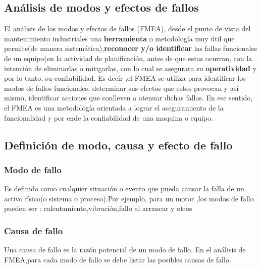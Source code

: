 \documentclass[
	12pt, %
	fleqn, %
	a4paper, %
	oneside, %
]{LegrandOrangeBook}
\begin{document}
\subsection{Análisis de modos y efectos de fallos}
El análisis de los modos y efectos de fallos (FMEA), desde el punto de vista del mantenimiento industriales una \textbf{herramienta} o metodología muy útil que permite(de manera sistemática),\textbf{reconocer y/o identificar} las fallas funcionales de un equipo(en la actividad de planificación, antes de que estas ocurran, con la intención de eliminarlas o mitigarlas, con lo cual se asegurara su \textbf{operatividad} y por lo tanto, su confiabilidad. Es decir ,el FMEA se utiliza para identificar los modos de fallos funcionales, determinar sus efectos que estos provocan y así mismo, identificar acciones que conlleven a atenuar dichas fallas. En ese sentido, el FMEA es una metodología orientada a lograr el aseguramiento de la funcionalidad y por ende la confiabilidad de una maquina o equipo.
\subsection{Definición de modo, causa y efecto de fallo}
\subsubsection{Modo de fallo}
Es definido como cualquier situación o evento que pueda causar la falla de un activo físico(o sistema o proceso).Por ejemplo, para un motor ,los modos de fallo pueden ser : calentamiento,vibración,fallo al arrancar y otros
\subsubsection{Causa de fallo}
Una causa de fallo es la razón potencial de un modo de fallo. En el análisis de FMEA,para cada modo de fallo se debe listar las posibles causas de fallo.
\end{document}
